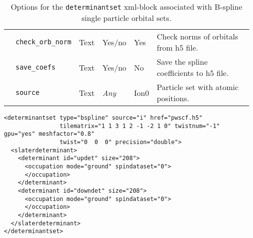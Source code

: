 \begin{table}[h]
\begin{center}
\begin{tabularx}{\textwidth}{l l l l l X }
   &   \texttt{check\_orb\_norm}        &  Text              &  Yes/no          & Yes               &  Check norms of orbitals from h5 file. \\
   &   \texttt{save\_coefs}             &  Text              &  Yes/no          & No                &  Save the spline coefficients to h5 file. \\
   &   \texttt{source}                  &  Text              &  \textit{Any}    & Ion0              &  Particle set with atomic positions. \\
  \hline
\end{tabularx}
\end{center}
\caption{Options for the \texttt{determinantset} xml-block associated with B-spline single particle orbital sets.}
\label{table:splineSPOs}
\end{table}


\begin{lstlisting}[style=QMCPXML,caption=Determinant set XML element.\label{listing:splineSPOs}]
<determinantset type="bspline" source="i" href="pwscf.h5"
                tilematrix="1 1 3 1 2 -1 -2 1 0" twistnum="-1" gpu="yes" meshfactor="0.8"
                twist="0  0  0" precision="double">
  <slaterdeterminant>
    <determinant id="updet" size="208">
      <occupation mode="ground" spindataset="0">
      </occupation>
    </determinant>
    <determinant id="downdet" size="208">
      <occupation mode="ground" spindataset="0">
      </occupation>
    </determinant>
  </slaterdeterminant>
</determinantset>
\end{lstlisting}

